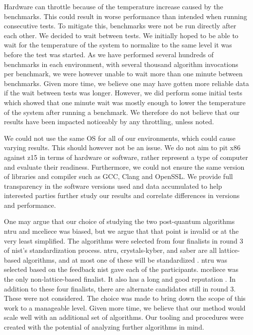 Hardware can throttle because of the temperature increase caused by the benchmarks. This could result in worse performance than intended when running consecutive tests. To mitigate this, benchmarks were not be run directly after each other. We decided to wait between tests. We initially hoped to be able to wait for the temperature of the system to normalize to the same level it was before the test was started. As we have performed several hundreds of benchmarks in each environment, with several thousand algorithm invocations per benchmark, we were however unable to wait more than one minute between benchmarks. Given more time, we believe one may have gotten more reliable data if the wait between tests was longer. However, we did perform some initial tests which showed that one minute wait was mostly enough to lower the temperature of the system after running a benchmark. We therefore do not believe that our results have been impacted noticeably by any throttling, unless noted. 

We could not use the same OS for all of our environments, which could cause varying results. This should however not be an issue. We do not aim to pit \gls{x86} against \gls{z15} in terms of hardware or software, rather represent a type of computer and evaluate their readiness. Furthermore, we could not ensure the same version of libraries and compiler such as GCC, Clang and OpenSSL. We provide full transparency in the software versions used and data accumulated to help interested parties further study our results and correlate differences in versions and performance.

One may argue that our choice of studying the two post-quantum algorithms \gls{ntru} and \gls{mceliece} was biased, but we argue that that point is invalid or at the very least simplified. The algorithms were selected from four finalists in round 3 of \gls{nist}'s standardization process. \gls{ntru}, \gls{crystals-kyber}, and \gls{saber} are all lattice-based algorithms, and at most one of these will be standardized \cite{nist2020}. \gls{ntru} was selected based on the feedback \gls{nist} gave each of the participants. \gls{mceliece} was the only non-lattice-based finalist. It also has a long and good reputation \cite{nist2020}. In addition to these four finalists, there are alternate candidates still in round 3. These were not considered. The choice was made to bring down the scope of this work to a manageable level. Given more time, we believe that our method would scale well with an additional set of algorithms. Our tooling and procedures were created with the potential of analyzing further algorithms in mind.

